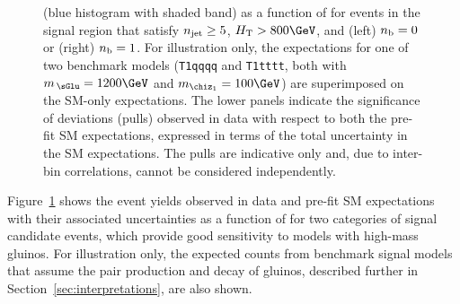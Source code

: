 \begin{figure}[!t]
{    (blue histogram with shaded band) as a function of \HTmiss for
    events in the signal region that satisfy $n_{\text{jet}} \geq 5$, $\scalht
    > 800\GeV$, and (left) $n_{\text{b}} = 0$ or (right) $n_{\text{b}} = 1$. For
    illustration only, the expectations for one of two benchmark
    models (\texttt{T1qqqq} and \texttt{T1tttt}, both with
    $m_{\,\sGlu} = 1200\GeV$ and $m_{\chiz_1} = 100\GeV$) are
    superimposed on the SM-only expectations. The lower panels
    indicate the significance of deviations (pulls) observed in data
    with respect to both the pre-fit SM expectations, expressed in
    terms of the total uncertainty in the SM expectations. The pulls
    are indicative only and, due to inter-bin correlations, cannot be
    considered independently. }
    \label{fig:mht-templates} 
\end{figure}

Figure~\ref{fig:mht-templates} shows the event yields observed in data
and pre-fit SM expectations with their associated uncertainties as
a function of \HTmiss for two categories of signal candidate events,
which provide good sensitivity to models with high-mass gluinos. For
illustration only, the expected counts from benchmark signal models
that assume the pair production and decay of gluinos, described
further in Section~\ref{sec:interpretations}, are also shown.

%
%
%

